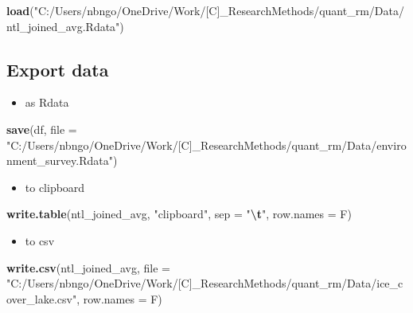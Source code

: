\documentclass[
  a4paper,
]{article}
\newenvironment{Shaded}{\begin{snugshade}}{\end{snugshade}}
\newcommand{\AttributeTok}[1]{\textcolor[rgb]{0.13,0.29,0.53}{#1}}
\newcommand{\FunctionTok}[1]{\textcolor[rgb]{0.13,0.29,0.53}{\textbf{#1}}}
\newcommand{\NormalTok}[1]{#1}
\newcommand{\SpecialCharTok}[1]{\textcolor[rgb]{0.81,0.36,0.00}{\textbf{#1}}}
\newcommand{\StringTok}[1]{\textcolor[rgb]{0.31,0.60,0.02}{#1}}
\providecommand{\tightlist}{%
  \setlength{\itemsep}{0pt}\setlength{\parskip}{0pt}}
\begin{document}
\begin{Shaded}
\begin{Highlighting}[]
\FunctionTok{load}\NormalTok{(}\StringTok{"C:/Users/nbngo/OneDrive/Work/[C]\_ResearchMethods/quant\_rm/Data/ntl\_joined\_avg.Rdata"}\NormalTok{)}
\end{Highlighting}
\end{Shaded}

\subsection{Export data}\label{export-data}

\begin{itemize}
\tightlist
\item
  as Rdata
\end{itemize}

\begin{Shaded}
\begin{Highlighting}[]
\FunctionTok{save}\NormalTok{(df, }\AttributeTok{file =} \StringTok{"C:/Users/nbngo/OneDrive/Work/[C]\_ResearchMethods/quant\_rm/Data/environment\_survey.Rdata"}\NormalTok{)}
\end{Highlighting}
\end{Shaded}

\begin{itemize}
\tightlist
\item
  to clipboard
\end{itemize}

\begin{Shaded}
\begin{Highlighting}[]
\FunctionTok{write.table}\NormalTok{(ntl\_joined\_avg, }\StringTok{"clipboard"}\NormalTok{, }\AttributeTok{sep =} \StringTok{"}\SpecialCharTok{\textbackslash{}t}\StringTok{"}\NormalTok{, }\AttributeTok{row.names =}\NormalTok{ F)}
\end{Highlighting}
\end{Shaded}

\begin{itemize}
\tightlist
\item
  to csv
\end{itemize}

\begin{Shaded}
\begin{Highlighting}[]
\FunctionTok{write.csv}\NormalTok{(ntl\_joined\_avg, }\AttributeTok{file =} \StringTok{"C:/Users/nbngo/OneDrive/Work/[C]\_ResearchMethods/quant\_rm/Data/ice\_cover\_lake.csv"}\NormalTok{,}
    \AttributeTok{row.names =}\NormalTok{ F)}
\end{Highlighting}
\end{Shaded}
\end{document}
